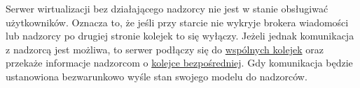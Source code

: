 \documentclass[../opis-rozwiazania.tex]{subfiles}
\begin{document}
Serwer wirtualizacji bez działającego nadzorcy nie jest w stanie obsługiwać użytkowników.
Oznacza to, że jeśli przy starcie nie wykryje brokera wiadomości
lub nadzorcy po drugiej stronie kolejek\parencite{rabbit-ack} to się wyłączy.
Jeżeli jednak komunikacja z nadzorcą jest możliwa, to serwer podłączy się do \hyperref[modules:broker:queue-virtsrv]{wspólnych kolejek}
oraz przekaże informacje nadzorcom o \hyperref[modules:broker:queue-exclusive]{kolejce bezpośredniej}.
Gdy komunikacja będzie ustanowiona bezwarunkowo wyśle stan swojego modelu do nadzorców.
\end{document}

